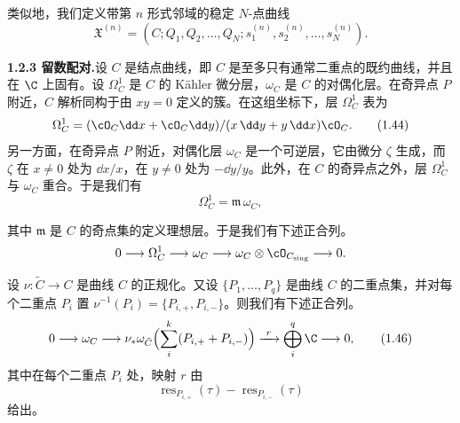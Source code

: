 类似地，我们定义带第 $n$ 形式邻域的稳定 $N$-点曲线
\[
\mathfrak{X}^{(n)}=(C;Q_1,Q_2,\dots,Q_N;s_1^{(n)},s_2^{(n)},\dots,s_N^{(n)}).
\]

\noindent\textbf{1.2.3 留数配对.}\quad 设 $C$ 是结点曲线，即 $C$ 是至多只有通常二重点的既约曲线，并且在 $\C$ 上固有。设 $\Omega^1_C$ 是 $C$ 的 Kähler 微分层，$\omega_C$ 是 $C$ 的对偶化层。在奇异点 $P$ 附近，$C$ 解析同构于由 $xy=0$ 定义的簇。在这组坐标下，层 $\Omega^1_C$ 表为
\begin{equation}
\Omega^1_C=(\cO_C\dd x+\cO_C\dd y)/(x\,\dd y+y\,\dd x)\cO_C. \tag{1.44}
\end{equation}
另一方面，在奇异点 $P$ 附近，对偶化层 $\omega_C$ 是一个可逆层，它由微分 $\zeta$ 生成，而 $\zeta$ 在 $x\ne 0$ 处为 $\dd x/x$，在 $y\ne 0$ 处为 $-\dd y/y$。此外，在 $C$ 的奇异点之外，层 $\Omega^1_C$ 与 $\omega_C$ 重合。于是我们有
\begin{equation}
\Omega^1_C=\mathfrak{m}\,\omega_C, \tag{1.45}
\end{equation}

其中 $\mathfrak{m}$ 是 $C$ 的奇点集的定义理想层。于是我们有下述正合列。
\[
0\longrightarrow\Omega^1_C\longrightarrow\omega_C\longrightarrow\omega_C\otimes\cO_{C_{\mathrm{sing}}}\longrightarrow 0 .
\]

设 $\nu:\tilde C\to C$ 是曲线 $C$ 的正规化。又设 $\{P_1,\dots,P_q\}$ 是曲线 $C$ 的二重点集，并对每个二重点 $P_i$ 置 $\nu^{-1}(P_i)=\{P_{i,+},P_{i,-}\}$。则我们有下述正合列。
\begin{equation}
0\longrightarrow\omega_C\longrightarrow\nu_\ast\omega_{\tilde C}\Bigl(\sum_i^k(P_{i,+}+P_{i,-})\Bigr)\xrightarrow{\ r\ }\bigoplus_i^q\C\longrightarrow 0, \tag{1.46}
\end{equation}
其中在每个二重点 $P_i$ 处，映射 $r$ 由
\[
\operatorname{res}_{P_{i,+}}(\tau)-\operatorname{res}_{P_{i,-}}(\tau)
\]
给出。

